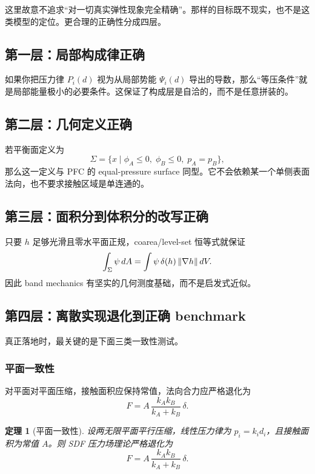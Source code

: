 \documentclass[12pt,a4paper]{ctexart}
\newtheorem{theorem}{定理}
\begin{document}
这里故意不追求“对一切真实弹性现象完全精确”。那样的目标既不现实，也不是这类模型的定位。更合理的正确性分成四层。

\subsection{第一层：局部构成律正确}
如果你把压力律 $P_i(d)$ 视为从局部势能 $\Psi_i(d)$ 导出的导数，那么“等压条件”就是局部能量极小的必要条件。这保证了构成层是自洽的，而不是任意拼装的。

\subsection{第二层：几何定义正确}
若平衡面定义为
\begin{equation}
    \Sigma=\{x\mid \phi_A\le 0,\;\phi_B\le 0,\;p_A=p_B\},
\end{equation}
那么这一定义与 PFC 的 equal-pressure surface 同型。它不会依赖某一个单侧表面法向，也不要求接触区域是单连通的。

\subsection{第三层：面积分到体积分的改写正确}
只要 $h$ 足够光滑且零水平面正规，coarea/level-set 恒等式就保证
\begin{equation}
    \int_{\Sigma}\psi\,dA
    =
    \int \psi\,\delta(h)\,\norm{\nabla h}\,dV.
\end{equation}
因此 band mechanics 有坚实的几何测度基础，而不是启发式近似。

\subsection{第四层：离散实现退化到正确 benchmark}
真正落地时，最关键的是下面三类一致性测试。

\subsubsection{平面一致性}
对平面对平面压缩，接触面积应保持常值，法向合力应严格退化为
\begin{equation}
    F = A\,\frac{k_Ak_B}{k_A+k_B}\,\delta.
\end{equation}

\begin{theorem}[平面一致性]
设两无限平面平行压缩，线性压力律为 $p_i=k_i d_i$，且接触面积为常值 $A$。则 SDF 压力场理论严格退化为
\begin{equation}
    F = A\,\frac{k_Ak_B}{k_A+k_B}\,\delta.
\end{equation}
\end{theorem}
\end{document}
